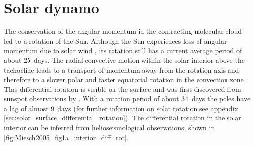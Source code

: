 \section{Solar dynamo}
\label{sec:solar_dynamics}
The conservation of the angular momentum in the contracting molecular cloud led to a rotation of the Sun. Although the Sun experiences loss of angular momentum due to solar wind \citep{Weber1967}, its rotation still has a current average period of about 25~days. The radial convective motion within the solar interior above the tachocline leads to a transport of momentum away from the rotation axis and therefore to a slower polar and faster equatorial rotation in the convection zone \citep{Miesch2005}. This differential rotation is visible on the surface and was first discovered from sunspot observations by \citet{Scheiner1630}. With a rotation period of about 34~days the poles have a lag of almost 9~days (for further information on solar rotation see appendix \autoref{sec:solar_surface_differential_rotation}). The differential rotation in the solar interior can be inferred from helioseismological observations, shown in \autoref{fig:Miesch2005_fig1a_interior_diff_rot}.

